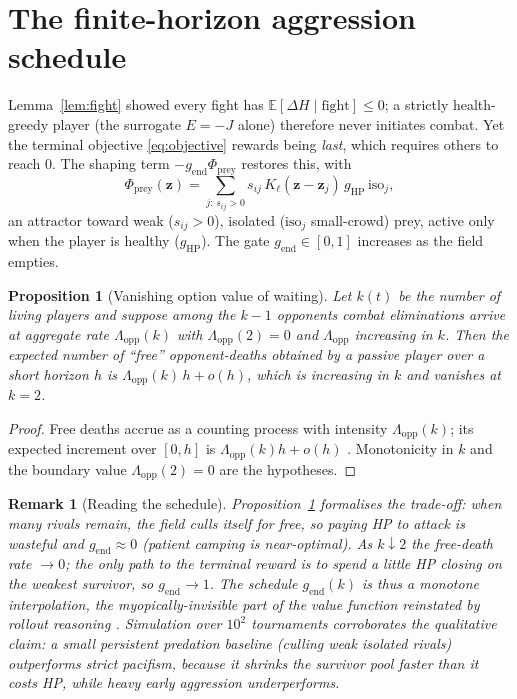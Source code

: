 \documentclass[11pt]{article}
\newtheorem{proposition}[theorem]{Proposition}
\newtheorem*{remark}{Remark}
\newcommand{\E}{\mathbb{E}}
\newcommand{\z}{\mathbf{z}}
\begin{document}
\newpage
\section{The finite-horizon aggression schedule}\label{sec:aggression}

Lemma~\ref{lem:fight} showed every fight has $\E[\Delta H\mid\text{fight}]\le0$;
a strictly health-greedy player (the surrogate $E=-J$ alone) therefore never
initiates combat. Yet the terminal objective \eqref{eq:objective} rewards being
\emph{last}, which requires others to reach $0$. The shaping term
$-g_{\mathrm{end}}\Phi_{\mathrm{prey}}$ restores this, with
\begin{equation}\label{eq:prey}
  \Phi_{\mathrm{prey}}(\z)=\sum_{j:\,s_{ij}>0} s_{ij}\,K_\ell(\z-\z_j)\,g_{\mathrm{HP}}\,\mathrm{iso}_j,
\end{equation}
an attractor toward weak ($s_{ij}>0$), isolated ($\mathrm{iso}_j$ small-crowd)
prey, active only when the player is healthy ($g_{\mathrm{HP}}$). The gate
$g_{\mathrm{end}}\in[0,1]$ increases as the field empties.

\begin{proposition}[Vanishing option value of waiting]\label{prop:wait}
Let $k(t)$ be the number of living players and suppose among the $k-1$ opponents
combat eliminations arrive at aggregate rate $\Lambda_{\mathrm{opp}}(k)$ with
$\Lambda_{\mathrm{opp}}(2)=0$ and $\Lambda_{\mathrm{opp}}$ increasing in $k$.
Then the expected number of ``free'' opponent-deaths obtained by a passive player
over a short horizon $h$ is $\Lambda_{\mathrm{opp}}(k)\,h+o(h)$, which is
increasing in $k$ and vanishes at $k=2$.
\end{proposition}

\begin{proof}
Free deaths accrue as a counting process with intensity
$\Lambda_{\mathrm{opp}}(k)$; its expected increment over $[0,h]$ is
$\Lambda_{\mathrm{opp}}(k)h+o(h)$ \cite{Kingman}. Monotonicity in $k$ and the
boundary value $\Lambda_{\mathrm{opp}}(2)=0$ are the hypotheses.
\end{proof}

\begin{remark}[Reading the schedule]
Proposition~\ref{prop:wait} formalises the trade-off: when many rivals remain,
the field culls itself for free, so paying HP to attack is wasteful and
$g_{\mathrm{end}}\!\approx\!0$ (patient camping is near-optimal). As $k\downarrow2$
the free-death rate $\to0$; the only path to the terminal reward is to spend a
little HP closing on the weakest survivor, so $g_{\mathrm{end}}\to1$. The schedule
$g_{\mathrm{end}}(k)$ is thus a monotone interpolation, the myopically-invisible
part of the value function reinstated by rollout reasoning \cite[Ch.~6]{Bertsekas}.
Simulation over $10^2$ tournaments corroborates the qualitative claim: a small
\emph{persistent} predation baseline (culling weak isolated rivals) outperforms
strict pacifism, because it shrinks the survivor pool faster than it costs HP,
while heavy early aggression underperforms.
\end{remark}
\end{document}

